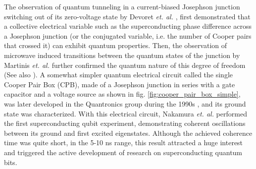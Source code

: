 The observation of quantum tunneling in a current-biased
Josephson junction switching out of its zero-voltage
state by Devoret {\it et. al.} \citep{devoret_measurements_1985,martinis_energy-level_1985},
first demonstrated that a collective electrical variable
such as the superconducting phase difference across a Josephson junction (or the conjugated variable, i.e. the number of Cooper
pairs that crossed it) can exhibit quantum properties. Then,
the observation of microwave induced transitions between the quantum
states of the junction by Martinis {\it et. al.} \citep{martinis_energy-level_1985} further
confirmed the quantum nature of this degree of freedom (See also \cite{martinis_energy-level_1985,martinis_experimental_1987,clarke_quantum_1988}).
A somewhat simpler quantum electrical circuit called the single Cooper
Pair Box (CPB), made of a Josephson junction in series
with a gate capacitor and a voltage source as shown in fig.
\ref{fig:cooper_pair_box_simple}, was later developed in the Quantronics
group during the 1990s \citep{bouchiat_quantum_1998},
and its ground state was characterized. With this electrical
circuit, Nakamura {\it et. al.} \citep{nakamura_coherent_1999} performed the first superconducting
qubit experiment, demonstrating coherent oscillations between its
ground and first excited eigenstates. Although the achieved coherence
time was quite short, in the 5-10 ns range, this result attracted
a huge interest and triggered the active development of research on
superconducting quantum bits.

\smallskip

